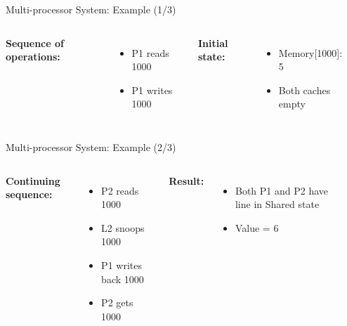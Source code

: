 \documentclass[aspectratio=169,12pt]{beamer}
\begin{document}
\begin{frame}{Multi-processor System: Example (1/3)}
\begin{columns}
\textbf{Sequence of operations:}
\begin{itemize}
\item P1 reads 1000
\item P1 writes 1000
\end{itemize}

\vspace{1em}
\textbf{Initial state:}
\begin{itemize}
\item Memory[1000]: 5
\item Both caches empty
\end{itemize}

\begin{center}
\end{center}
\end{columns}
\end{frame}

\begin{frame}{Multi-processor System: Example (2/3)}
\begin{columns}
\textbf{Continuing sequence:}
\begin{itemize}
\item P2 reads 1000
\item L2 snoops 1000
\item P1 writes back 1000
\item P2 gets 1000
\end{itemize}

\vspace{1em}
\textbf{Result:}
\begin{itemize}
\item Both P1 and P2 have line in Shared state
\item Value = 6
\end{itemize}

\begin{center}
\end{center}
\end{columns}
\end{frame}
\end{document}
